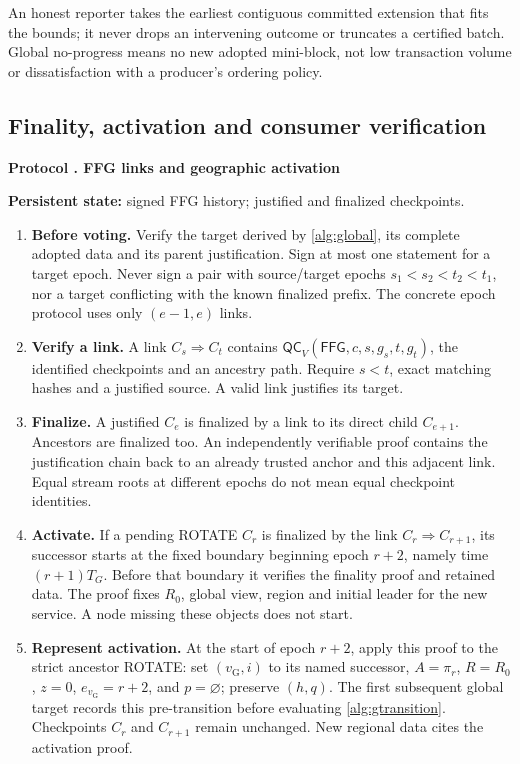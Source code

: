 \documentclass[11pt,a4paper,onecolumn]{article}
\newcommand{\QC}{\mathsf{QC}}
\newcommand{\gv}{v_{\mathrm G}}
\newcommand{\Tag}[1]{\mathsf{#1}}
\theoremstyle{remark}\newtheorem{example}[definition]{Example}
\newcounter{protocol}
\newenvironment{protocol}[2]{\refstepcounter{protocol}\label{#1}\begin{mdframed}[nobreak=true,linewidth=.6pt,skipabove=10pt,skipbelow=10pt,innertopmargin=8pt,innerbottommargin=8pt]\small\raggedright\noindent\textbf{Protocol \theprotocol. #2}\par\smallskip}{\end{mdframed}}
\begin{document}
An honest reporter takes the earliest contiguous committed extension that fits
the bounds; it never drops an intervening outcome or truncates a certified batch.
Global no-progress means no new adopted mini-block, not low transaction volume
or dissatisfaction with a producer's ordering policy.

\subsection{Finality, activation and consumer verification}\label{sec:finality}
\begin{protocol}{alg:finality}{FFG links and geographic activation}
\textbf{Persistent state:} signed FFG history; justified and finalized checkpoints.
\begin{enumerate}[label=\textbf{F\arabic*.}]
\item \textbf{Before voting.} Verify the target derived by \cref{alg:global},
its complete adopted data and its parent justification. Sign at most one
statement for a target epoch. Never sign a pair with source/target epochs
$s_1<s_2<t_2<t_1$, nor a target conflicting with the known finalized prefix.
The concrete epoch protocol uses only $(e-1,e)$ links.
\item \textbf{Verify a link.} A link $C_s\Rightarrow C_t$ contains
$\QC_V(\Tag{FFG},c,s,g_s,t,g_t)$, the identified checkpoints and an ancestry
path. Require $s<t$, exact matching hashes and a justified source.
A valid link justifies its target.
\item \textbf{Finalize.} A justified $C_e$ is finalized by a link to its direct
child $C_{e+1}$. Ancestors are finalized too. An independently verifiable proof
contains the justification chain back to an already trusted anchor and this
adjacent link. Equal stream roots at different epochs do not mean equal
checkpoint identities.
\item \textbf{Activate.} If a pending ROTATE $C_r$ is finalized by the link
$C_r\Rightarrow C_{r+1}$, its successor starts at the fixed boundary beginning
epoch $r+2$, namely time $(r+1)T_G$. Before that boundary it verifies the finality
proof and retained data. The proof fixes $R_0$, global view, region and initial
leader for the new service. A node missing these objects does not start.
\item \textbf{Represent activation.} At the start of epoch $r+2$, apply this
proof to the strict ancestor ROTATE: set $(\gv,i)$ to its named successor,
$A=\pi_r$, $R=R_0$, $z=0$, $e_{\gv}=r+2$, and $p=\varnothing$;
preserve $(h,q)$. The first subsequent global target records this pre-transition
before evaluating \cref{alg:gtransition}. Checkpoints $C_r$ and
$C_{r+1}$ remain unchanged. New regional data cites the activation proof.
\end{enumerate}
\end{protocol}
\end{document}
